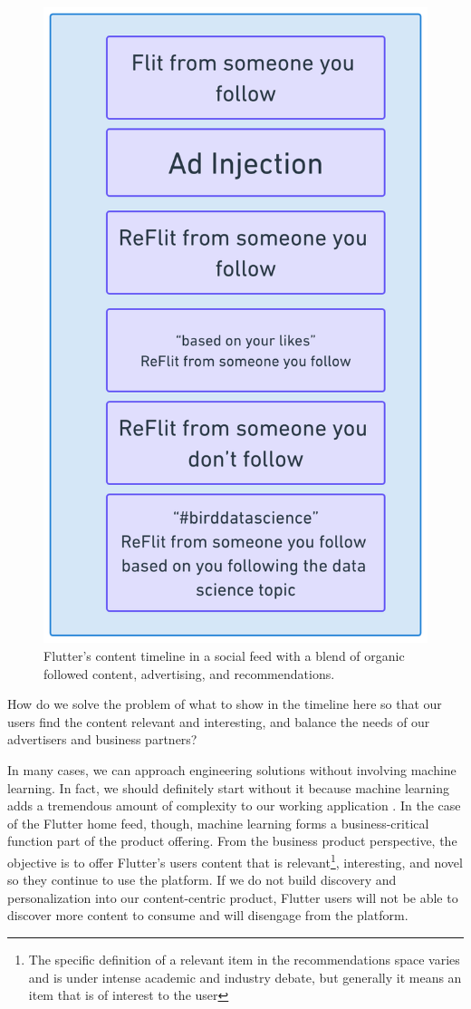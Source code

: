 \documentclass[11pt, table]{diazessay} %
\begin{document}
\begin{sloppypar}
\begin{figure}[H]
\centering
\includegraphics[width=.5\textwidth]{figures/timeline.png}
\caption{Flutter's content timeline in a social feed with a blend of organic followed content, advertising, and recommendations.}
\end{figure}

How do we solve the problem of what to show in the timeline here so that our users find the content relevant and interesting, and balance the needs of our advertisers and business partners?

In many cases, we can approach engineering solutions without involving machine learning. In fact, we should definitely start without it \citep{zinkevich2017rules} because machine learning adds a tremendous amount of complexity to our working application \citep{sculley2014machine}. In the case of the Flutter home feed, though, machine learning forms a business-critical function part of the product offering. From the business product perspective, the objective is to offer Flutter’s users content that is relevant\footnote{The specific definition of a relevant item in the recommendations space varies and is under intense academic and industry debate, but generally it means an item that is of interest to the user}, interesting, and novel so they continue to use the platform.  If we do not build discovery and personalization into our content-centric product, Flutter users will not be able to discover more content to consume and will disengage from the platform.


\end{sloppypar}
\end{document}
